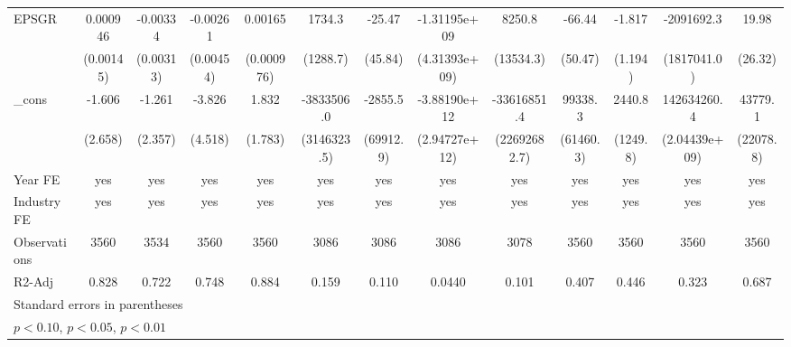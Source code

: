 \begin{table}[htbp]
\begin{tabular}{l*{12}{c}}
EPSGR               &    0.000946         &    -0.00334         &    -0.00261         &     0.00165         &      1734.3         &      -25.47         &-1.31195e+09         &      8250.8         &      -66.44         &      -1.817         &  -2091692.3         &       19.98         \\
                    &   (0.00145)         &   (0.00313)         &   (0.00454)         &  (0.000976)         &    (1288.7)         &     (45.84)         &(4.31393e+09)         &   (13534.3)         &     (50.47)         &     (1.194)         & (1817041.0)         &     (26.32)         \\
\_cons              &      -1.606         &      -1.261         &      -3.826         &       1.832         &  -3833506.0         &     -2855.5         &-3.88190e+12         & -33616851.4         &     99338.3         &      2440.8\sym{*}  & 142634260.4         &     43779.1\sym{*}  \\
                    &     (2.658)         &     (2.357)         &     (4.518)         &     (1.783)         & (3146323.5)         &   (69912.9)         &(2.94727e+12)         &(22692682.7)         &   (61460.3)         &    (1249.8)         &(2.04439e+09)         &   (22078.8)         \\
\hline
Year FE             &         yes         &         yes         &         yes         &         yes         &         yes         &         yes         &         yes         &         yes         &         yes         &         yes         &         yes         &         yes         \\
Industry FE         &         yes         &         yes         &         yes         &         yes         &         yes         &         yes         &         yes         &         yes         &         yes         &         yes         &         yes         &         yes         \\
Observations        &        3560         &        3534         &        3560         &        3560         &        3086         &        3086         &        3086         &        3078         &        3560         &        3560         &        3560         &        3560         \\
R2-Adj              &       0.828         &       0.722         &       0.748         &       0.884         &       0.159         &       0.110         &      0.0440         &       0.101         &       0.407         &       0.446         &       0.323         &       0.687         \\
\hline\hline
\multicolumn{13}{l}{\footnotesize Standard errors in parentheses}\\
\multicolumn{13}{l}{\footnotesize \sym{*} \(p<0.10\), \sym{**} \(p<0.05\), \sym{***} \(p<0.01\)}\\
\end{tabular}
\end{table}
